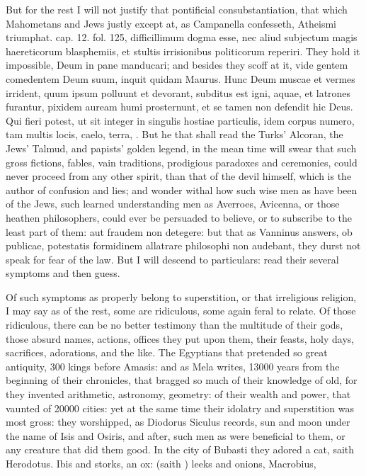 {But for the rest I will not justify that pontificial consubstantiation,
that which Mahometans and Jews justly except at, as Campanella
confesseth, Atheismi triumphat. cap. 12. fol. 125, difficillimum dogma
esse, nec aliud subjectum magis haereticorum blasphemiis, et stultis
irrisionibus politicorum reperiri. They hold it impossible, Deum in
pane manducari; and besides they scoff at it, vide gentem comedentem
Deum suum, inquit quidam Maurus. Hunc Deum muscae et vermes
irrident, quum ipsum polluunt et devorant, subditus est igni, aquae, et
latrones furantur, pixidem auream humi prosternunt, et se tamen non
defendit hic Deus. Qui fieri potest, ut sit integer in singulis hostiae
particulis, idem corpus numero, tam multis locis, caelo, terra, \etc{}. But
he that shall read the Turks' Alcoran, the Jews' Talmud, and
papists' golden legend, in the mean time will swear that such gross
fictions, fables, vain traditions, prodigious paradoxes and ceremonies,
could never proceed from any other spirit, than that of the devil
himself, which is the author of confusion and lies; and wonder withal
how such wise men as have been of the Jews, such learned understanding
men as Averroes, Avicenna, or those heathen philosophers, could ever be
persuaded to believe, or to subscribe to the least part of them: aut
fraudem non detegere: but that as Vanninus answers, ob publicae,
potestatis formidinem allatrare philosophi non audebant, they durst not
speak for fear of the law. But I will descend to particulars: read
their several symptoms and then guess.

Of such symptoms as properly belong to superstition, or that
irreligious religion, I may say as of the rest, some are ridiculous,
some again feral to relate. Of those ridiculous, there can be no better
testimony than the multitude of their gods, those absurd names,
actions, offices they put upon them, their feasts, holy days,
sacrifices, adorations, and the like. The Egyptians that pretended so
great antiquity, 300 kings before Amasis: and as Mela writes, 13\thinspace{}000
years from the beginning of their chronicles, that bragged so much of
their knowledge of old, for they invented arithmetic, astronomy,
geometry: of their wealth and power, that vaunted of 20\thinspace{}000 cities: yet
at the same time their idolatry and superstition was most gross: they
worshipped, as Diodorus Siculus records, sun and moon under the name of
Isis and Osiris, and after, such men as were beneficial to them, or any
creature that did them good. In the city of Bubasti they adored a cat,
saith Herodotus. Ibis and storks, an ox: (saith \Pliny{}) leeks and
onions, Macrobius,

}
